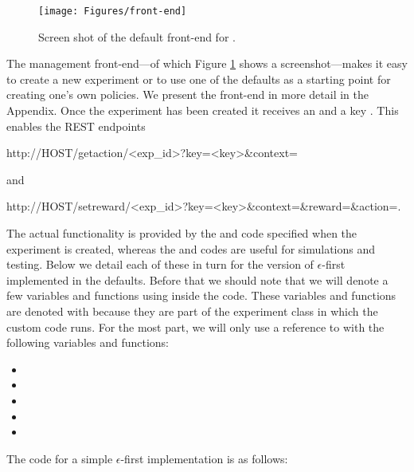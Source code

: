 \documentclass[nojss]{jss}
\begin{document}
\begin{figure}[htp!]
  \centering
    \texttt{[image: Figures/front-end]}
    \label{fig:front-end}
      \caption{Screen shot of the default front-end for .}
\end{figure}

The management front-end---of which Figure \ref{fig:front-end} shows  a screenshot---makes it easy to create a new experiment or to use  one of the defaults as a starting point for creating one's own policies. We present the front-end in more detail in the Appendix. Once the experiment has been created it receives an  and a key . This enables the REST endpoints
\begin{Code} 
http://HOST/getaction/<exp_id>?key=<key>&context={}
\end{Code}  
and
\begin{Code} 
http://HOST/setreward/<exp_id>?key=<key>&context={}&reward={}&action={}.
\end{Code} 

The actual functionality is provided by the  and  code specified when the experiment is created, whereas the  and  codes are useful for simulations and testing. Below we detail each of these in turn for the version of $\epsilon$-first implemented in the defaults. Before that we should note that we will denote a few variables and functions using  inside the code. These variables and functions are denoted with  because they are part of the experiment class in which the custom code runs. For the most part, we will only use a reference to  with the following variables and functions:

\begin{itemize}

\item {}
\item {}
\item {}
\item {}
\item {}
\end{itemize}

The code for a simple $\epsilon$-first implementation is as follows:
\end{document}

